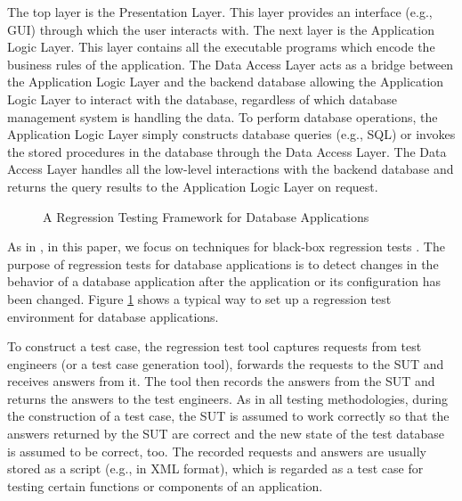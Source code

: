 \documentclass[authoryear,preprint,12pt]{elsarticle}
\begin{document}
The top layer is the Presentation Layer.  This layer provides an interface (e.g., GUI) through which the user interacts with.  The next layer is the Application Logic Layer.  This layer contains all the executable programs which encode the business rules of the application.  The Data Access Layer acts as a bridge between the Application Logic Layer and the backend database allowing the Application Logic Layer to interact with the database, regardless of which database management system is handling the data. To perform database operations, the Application Logic Layer simply constructs database queries (e.g., SQL)
or invokes the stored procedures in the database through the Data Access Layer.
The Data Access Layer handles all the low-level interactions with the backend database and returns the query results to the Application Logic Layer on request.

\begin{figure}
\centering
{}
\caption{A Regression Testing Framework for Database Applications}
\label{regressiontest}
\end{figure}

As in \cite{cidr05}, in this paper, we focus on techniques for black-box regression tests \cite{sebook}.
The purpose of regression tests for database applications is to detect changes in the behavior of a database application after the application or its configuration has been changed.  
Figure \ref{regressiontest} shows a typical way to set up a regression test environment for database applications.

To construct a test case, the regression test tool captures requests from test engineers (or a test case generation tool), 
forwards the requests to the SUT and receives answers from it.  
The tool then records the answers from the SUT and returns the answers to the test engineers.  
As in all testing methodologies, during the construction of a test case,
the SUT is assumed to work correctly so that the answers returned by the SUT are correct 
and the new state of the test database is assumed to be correct, too.  
The recorded requests and answers are usually stored as a script (e.g., in XML format), 
which is regarded as a test case for testing certain functions or components of an application.
\end{document}
